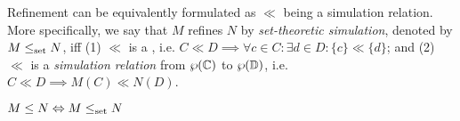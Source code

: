 
Refinement can be equivalently formulated as $\ll$ being a simulation relation. More specifically, we say that $M$ refines $N$ by \textit{set-theoretic simulation}, denoted by $M \leq_{\textrm{set}} N$, iff (1) $\ll$ is a , i.e. $C \ll D \implies \forall c \in C: \exists d \in D: \{ c \} \ll \{ d \}$; and (2) $\ll$ is a \textit{simulation relation} from $\wp(\mathbb{C})$ to $\wp(\mathbb{D})$, i.e. $C \ll D \implies M(C) \ll N(D)$.




\begin{theorem} \label{thm:traj-equal-set}
$M \leq N \Leftrightarrow M \leq_{\textrm{set}} N$
\end{theorem}

\noindent {}
